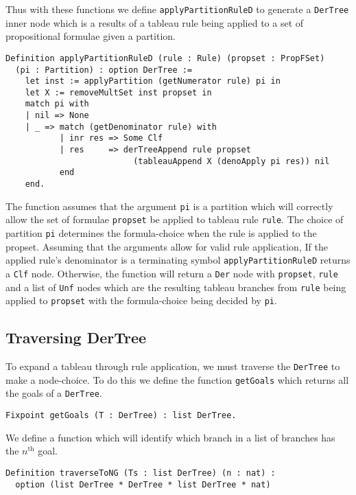 \documentclass{llncs}
\begin{document}
Thus with these functions we define \verb+applyPartitionRuleD+ to generate a
\verb+DerTree+ inner node which is a results of a tableau rule being applied to
a set of propositional formulae given a partition.

\begin{verbatim}
Definition applyPartitionRuleD (rule : Rule) (propset : PropFSet)
  (pi : Partition) : option DerTree :=
    let inst := applyPartition (getNumerator rule) pi in
    let X := removeMultSet inst propset in
    match pi with
    | nil => None
    | _ => match (getDenominator rule) with
           | inr res => Some Clf
           | res     => derTreeAppend rule propset
                          (tableauAppend X (denoApply pi res)) nil
           end
    end.
\end{verbatim}

The function assumes that the argument \verb+pi+ is a partition which will
correctly allow the set of formulae \verb+propset+ be applied to tableau rule
\verb+rule+. The choice of partition \verb+pi+ determines the formula-choice
when the rule is applied to the propset. Assuming that the arguments allow for
valid rule application, If the applied rule's denominator is a terminating
symbol \verb+applyPartitionRuleD+ returns a \verb+Clf+ node. Otherwise, the
function will return a \verb+Der+ node with \verb+propset+, \verb+rule+ and
a list of \verb+Unf+ nodes which are the resulting tableau branches from
\verb+rule+ being applied to \verb+propset+ with the formula-choice being
decided by \verb+pi+.

\subsection{Traversing DerTree}

To expand a tableau through rule application, we must traverse the
\verb+DerTree+ to make a node-choice. To do this we define the function
\verb+getGoals+ which returns all the goals of a \verb+DerTree+.

\begin{verbatim}
Fixpoint getGoals (T : DerTree) : list DerTree.
\end{verbatim}

We define a function which will identify which branch in a list of branches has
the $n^{\textrm{th}}$ goal.

\begin{verbatim}
Definition traverseToNG (Ts : list DerTree) (n : nat) :
  option (list DerTree * DerTree * list DerTree * nat)
\end{verbatim}
\end{document}
